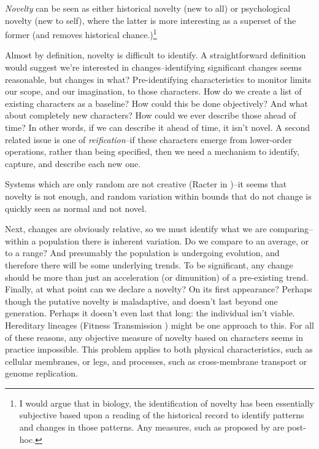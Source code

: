 \begin{mdframed}[style=box, frametitle={Creativity, and its relationship to Novelty, Surprise, and Value}]
\emph{Novelty} can be seen as either historical novelty (new to all) or psychological novelty (new to self), where the latter is more interesting as a superset of the former (and removes historical chance.)\footnote{I would argue that in biology, the identification of novelty has been essentially subjective based upon a reading of the historical record to identify patterns and changes in those patterns. Any measures, such as proposed by \cite{McShea1998,Maynard-Smith:1995lw,Walker2012} are post-hoc.}

Almost by definition, novelty is difficult to identify. A straightforward definition would suggest we're interested in changes--identifying significant changes seems reasonable, but changes in what? Pre-identifying characteristics to monitor limits our scope, and our imagination, to those characters. How do we create a list of existing characters as a baseline? How could this be done objectively? And what about completely new characters? How could we ever describe those ahead of time? In other words, if we can describe it ahead of time, it isn't novel. A second related issue is one of \textit{reification}--if these characters emerge from lower-order operations, rather than being specified, then we need a mechanism to identify, capture, and describe each new one.

Systems which are only random are not creative (\eg Racter in \cite[p.16]{Dorin2009})--it seems that novelty is not enough, and random variation within bounds that do not change is quickly seen as normal and not novel. 

Next, changes are obviously relative, so we must identify what we are comparing--within a population there is inherent variation. Do we compare to an average, or to a range? And presumably the population is undergoing evolution, and therefore there will be some underlying trends. To be significant, any change should be more than just an acceleration (or dimunition) of a pre-existing trend. Finally, at what point can we declare a novelty? On its first appearance? Perhaps though the putative novelty is maladaptive, and doesn't last beyond one generation. Perhaps it doesn't even last that long: the individual isn't viable. Hereditary lineages (\eg Fitness Transmission \parencite{Miconi:2007xh}) might be one approach to this. For all of these reasons, any objective measure of novelty based on characters seems in practice impossible. This problem applies to both physical characteristics, such as cellular membranes, or legs, and processes, such as cross-membrane transport or genome replication.


\end{mdframed}
